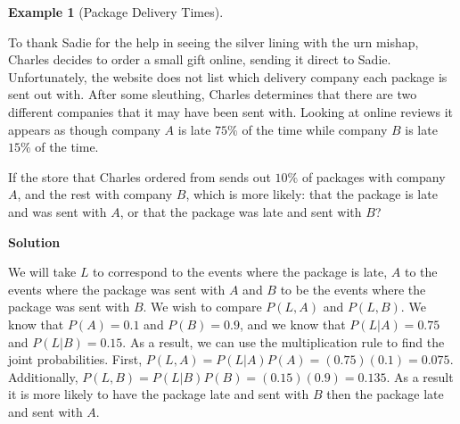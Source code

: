\documentclass[
  letterpaper,
  DIV=11,
  numbers=noendperiod]{scrreprt}
\theoremstyle{definition}
\theoremstyle{definition}
\newtheorem{example}{Example}[chapter]
\theoremstyle{definition}
\theoremstyle{remark}
\begin{document}
\begin{example}[Package Delivery
Times]\protect\hypertarget{exm-package-delivery-times}{}\label{exm-package-delivery-times}

To thank Sadie for the help in seeing the silver lining with the urn
mishap, Charles decides to order a small gift online, sending it direct
to Sadie. Unfortunately, the website does not list which delivery
company each package is sent out with. After some sleuthing, Charles
determines that there are two different companies that it may have been
sent with. Looking at online reviews it appears as though company \(A\)
is late \(75\%\) of the time while company \(B\) is late \(15\%\) of the
time.

If the store that Charles ordered from sends out \(10\%\) of packages
with company \(A\), and the rest with company \(B\), which is more
likely: that the package is late and was sent with \(A\), or that the
package was late and sent with \(B\)?

\begin{tcolorbox}[enhanced jigsaw, colback=white, colframe=quarto-callout-color-frame, arc=.35mm, leftrule=.75mm, rightrule=.15mm, opacityback=0, breakable, bottomrule=.15mm, left=2mm, toprule=.15mm]

\vspace{-3mm}\textbf{Solution}\vspace{3mm}

We will take \(L\) to correspond to the events where the package is
late, \(A\) to the events where the package was sent with \(A\) and
\(B\) to be the events where the package was sent with \(B\). We wish to
compare \(P(L, A)\) and \(P(L, B)\). We know that \(P(A) = 0.1\) and
\(P(B) = 0.9\), and we know that \(P(L|A) = 0.75\) and
\(P(L|B) = 0.15\). As a result, we can use the multiplication rule to
find the joint probabilities. First,
\(P(L, A) = P(L|A)P(A) = (0.75)(0.1) = 0.075\). Additionally,
\(P(L, B) = P(L|B)P(B) = (0.15)(0.9) = 0.135\). As a result it is more
likely to have the package late and sent with \(B\) then the package
late and sent with \(A\).\footnotemark{}

\end{tcolorbox}


\end{example}
\end{document}

